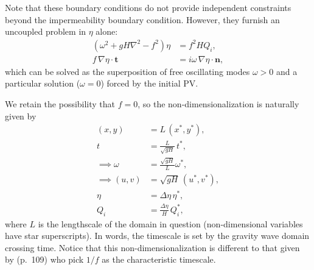 \documentclass[10pt,reqno]{amsart}
\newcommand{\nn}{{\mathbf n}}
\newcommand{\ttt}{{\mathbf t}}
\begin{document}
Note that these boundary conditions do not provide independent constraints beyond the impermeability boundary condition.
However, they furnish an uncoupled problem in $\eta$ alone:
\begin{align}
\left( \omega^2 + g H \nabla^2 - f^2 \right)
\eta
 & = 
f^2 H  Q_i, \nonumber   \\
f \, \nabla \eta \cdot \ttt & = i \omega \,  \nabla \eta \cdot \nn ,
\label{eqn:uncoupled_eta_problem}
\end{align}
which can be solved as the superposition of free oscillating modes $\omega > 0$ and a particular solution ($\omega = 0$) forced by the initial PV.

We retain the possibility that $f=0$, so the non-dimensionalization is naturally given by
\begin{align}
(x, y) &= L\, (x^*, y^*) , \nonumber \\
t &= \frac{L}{\sqrt{g H}}\, t^*  , \nonumber \\
\implies \omega &=   \frac{\sqrt{g H}}{L} \omega^* , \nonumber \\
\implies (u,v) & = \sqrt{g H} \, (u^*, v^*) , \nonumber \\
\eta & = \Delta \eta \, \eta^* , \nonumber \\
Q_i & = \frac{\Delta \eta}{H} \, Q_i^* ,
\end{align}
where $L$ is the lengthscale of the domain in question (non-dimensional variables have star superscripts). 
In words, the timescale is set by the gravity wave domain crossing time.
Notice that this non-dimensionalization is different to that given by \citet{pratt&whitehead08} (p.~109) who pick $1/f$ as the characteristic timescale.
\end{document}
